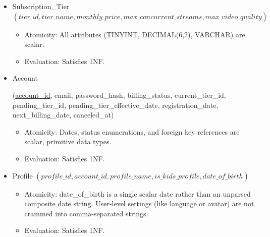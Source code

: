\begin{itemize}
\item
  Subscription\_\allowbreak{}Tier \((\underline{tier\_\allowbreak{} id},tier\_\allowbreak{} name,monthly\_\allowbreak{} price,max\_\allowbreak{} concurrent\_\allowbreak{} streams,max\_\allowbreak{} video\_\allowbreak{} quality)\)

  \begin{itemize}
  \item
    Atomicity: All attributes (TINYINT, DECIMAL(6,2), VARCHAR) are scalar.
  \item
    Evaluation: Satisfies 1NF.
  \end{itemize}
\item
  Account \begin{minipage}[t]{.88\linewidth}\raggedright\small (\underline{account\_\allowbreak{}id},\allowbreak{} email,\allowbreak{} password\_\allowbreak{}hash,\allowbreak{} billing\_\allowbreak{}status,\allowbreak{} current\_\allowbreak{}tier\_\allowbreak{}id,\allowbreak{} pending\_\allowbreak{}tier\_\allowbreak{}id,\allowbreak{} pending\_\allowbreak{}tier\_\allowbreak{}effective\_\allowbreak{}date,\allowbreak{} registration\_\allowbreak{}date,\allowbreak{} next\_\allowbreak{}billing\_\allowbreak{}date,\allowbreak{} canceled\_\allowbreak{}at)\end{minipage}

  \begin{itemize}
  \item
    Atomicity: Dates, status enumerations, and foreign key references are scalar, primitive data types.
  \item
    Evaluation: Satisfies 1NF.
  \end{itemize}
\item
  Profile \((\underline{profile\_\allowbreak{} id},account\_\allowbreak{} id,profile\_\allowbreak{} name,is\_\allowbreak{} kids\_\allowbreak{} profile,date\_\allowbreak{} of\_\allowbreak{} birth)\)

  \begin{itemize}
  \item
    Atomicity: date\_\allowbreak{}of\_\allowbreak{}birth is a single scalar date rather than an unparsed composite date string. User-level settings (like language or avatar) are not crammed into comma-separated strings.
  \item
    Evaluation: Satisfies 1NF.
  \end{itemize}
\end{itemize}

